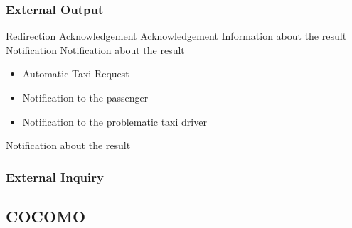 \subsubsection{External Output}
\begin{itemize}
	 Redirection
	 Acknowledgement
	 Acknowledgement
	 Information about the result
	 Notification
	 Notification about the result
	\begin{itemize}
		\item Automatic Taxi Request
		\item Notification to the passenger
		\item Notification to the problematic taxi driver
	\end{itemize}
	 Notification about the result
\end{itemize}
\subsubsection{External Inquiry}
\begin{itemize}
\end{itemize}
\subsection{COCOMO}
%